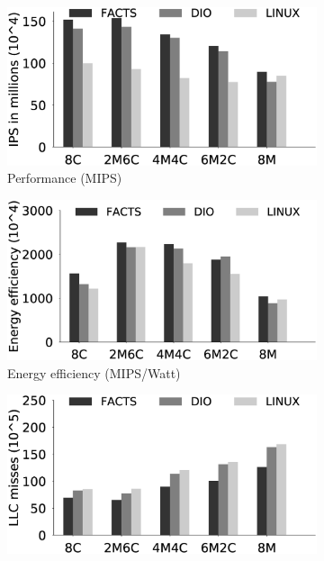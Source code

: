 \iffalse
\begin{figure}[tb!]
   \centering
    \begin{subfigure}{.5\textwidth}
        \centering
        \includegraphics[width=\textwidth]{Chapter3/Figs/consolidation/perf.eps}
        \caption{Performance (MIPS)}
        \label{fig: perfmips}
    \end{subfigure}
    \begin{subfigure}{0.5\textwidth}
        \centering
        \includegraphics[width=\textwidth]{Chapter3/Figs/consolidation/ef.eps}
        \caption{Energy efficiency (MIPS/Watt)}
        \label{fig: Energy Efficiency}
    \end{subfigure}%
    \begin{subfigure}{0.5\textwidth}
        \centering
        \includegraphics[width=\textwidth]{Chapter3/Figs/consolidation/llc.eps}

\end{subfigure}
\end{figure}
